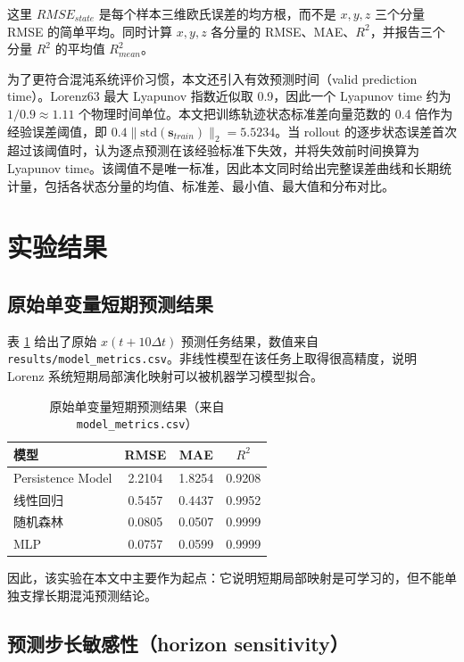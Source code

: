 \documentclass[UTF8,a4paper,12pt]{ctexart}
\begin{document}
这里 $RMSE_{state}$ 是每个样本三维欧氏误差的均方根，而不是 $x,y,z$ 三个分量 RMSE 的简单平均。同时计算 $x,y,z$ 各分量的 RMSE、MAE、$R^2$，并报告三个分量 $R^2$ 的平均值 $R^2_{mean}$。

为了更符合混沌系统评价习惯，本文还引入有效预测时间（valid prediction time）。Lorenz63 最大 Lyapunov 指数近似取 0.9，因此一个 Lyapunov time 约为 $1/0.9\approx1.11$ 个物理时间单位。本文把训练轨迹状态标准差向量范数的 0.4 倍作为经验误差阈值，即 $0.4\|\mathrm{std}(\mathbf{s}_{train})\|_2=5.5234$。当 rollout 的逐步状态误差首次超过该阈值时，认为逐点预测在该经验标准下失效，并将失效前时间换算为 Lyapunov time。该阈值不是唯一标准，因此本文同时给出完整误差曲线和长期统计量，包括各状态分量的均值、标准差、最小值、最大值和分布对比。

\section{实验结果}

\subsection{原始单变量短期预测结果}

表 \ref{tab:original_metrics} 给出了原始 $x(t+10\Delta t)$ 预测任务结果，数值来自 \texttt{results/model\_metrics.csv}。非线性模型在该任务上取得很高精度，说明 Lorenz 系统短期局部演化映射可以被机器学习模型拟合。

\begin{table}[H]
\centering
\caption{原始单变量短期预测结果（来自 \texttt{model\_metrics.csv}）}
\label{tab:original_metrics}
\begin{tabular}{lccc}
\toprule
模型 & RMSE & MAE & $R^2$ \\
\midrule
Persistence Model & 2.2104 & 1.8254 & 0.9208 \\
线性回归 & 0.5457 & 0.4437 & 0.9952 \\
随机森林 & 0.0805 & 0.0507 & 0.9999 \\
MLP & 0.0757 & 0.0599 & 0.9999 \\
\bottomrule
\end{tabular}
\end{table}

因此，该实验在本文中主要作为起点：它说明短期局部映射是可学习的，但不能单独支撑长期混沌预测结论。

\subsection{预测步长敏感性（horizon sensitivity）}
\end{document}
